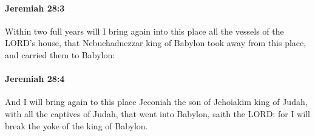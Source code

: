 		\paragraph{Jeremiah 28:3} %
			\label{JEREMIAH-28-3}

			Within two full years will I bring again into this place all the vessels of the LORD’s house, that Nebuchadnezzar king of Babylon took away from this place, and carried them to Babylon:


		\paragraph{Jeremiah 28:4} %
			\label{JEREMIAH-28-4}

			And I will bring again to this place Jeconiah the son of Jehoiakim king of Judah, with all the captives of Judah, that went into Babylon, saith the LORD: for I will break the yoke of the king of Babylon.

